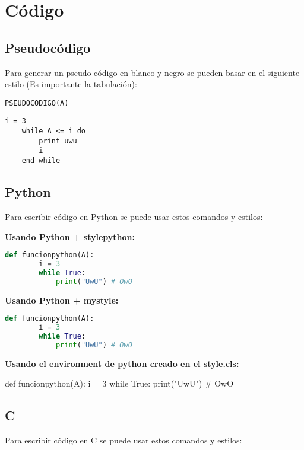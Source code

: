 \documentclass[../main.tex]{subfiles}
\begin{document}
\newpage
\section{Código}
\subsection{Pseudocódigo}
Para generar un pseudo código en blanco y negro se pueden basar en el siguiente estilo (Es importante la tabulación):

\texttt{PSEUDOCODIGO(A)} %
\begin{lstlisting}[style=blancoynegro]
    i = 3
    while A <= i do
        print uwu
        i --
    end while
\end{lstlisting}

\subsection{Python}
Para escribir código en Python se puede usar estos comandos y estilos:

\textbf{Usando Python + stylepython:}
\begin{lstlisting}[language=Python, style=stylepython]
    def funcionpython(A):
        i = 3
        while True:
            print("UwU") # OwO
\end{lstlisting}

\textbf{Usando Python + mystyle:}
\begin{lstlisting}[language=Python, style=mystyle]
    def funcionpython(A):
        i = 3
        while True:
            print("UwU") # OwO
\end{lstlisting}

\textbf{Usando el environment de python creado en el style.cls:}
\begin{python}
    def funcionpython(A):
        i = 3
        while True:
            print("UwU") # OwO
\end{python}



\newpage
\subsection{C}
Para escribir código en C se puede usar estos comandos y estilos:
\end{document}
